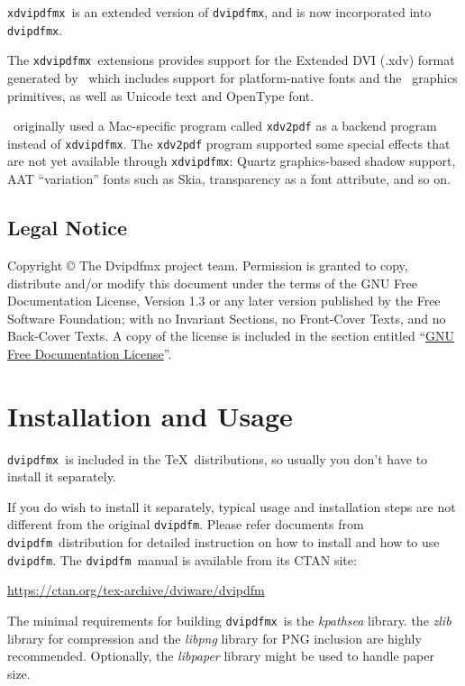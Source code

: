 \documentclass[a4paper,xetex,11pt]{report}
\newcommand{\code}[1]{\mbox{\texttt{#1}}}
\newcommand{\keyword}[1]{\textit{#1}}
\newcommand{\dvipdfm}{\texttt{dvipdfm}}
\newcommand{\dvipdfmx}{\texttt{dvipdfmx}}
\newcommand{\xdvipdfmx}{\texttt{xdvipdfmx}}
\begin{document}
\xdvipdfmx\ is an extended version of \dvipdfmx, and is now incorporated into
\dvipdfmx.

The \xdvipdfmx\ extensions provides support for the Extended DVI (.xdv) format
generated by \XeTeX\ which includes support for platform-native fonts and the
\XeTeX\ graphics primitives, as well as Unicode text and OpenType font.

\XeTeX\ originally used a Mac-specific program called \code{xdv2pdf} as
a backend program instead of \xdvipdfmx. The \code{xdv2pdf} program
supported some special effects that are not yet available through
\xdvipdfmx: Quartz graphics-based shadow support, AAT ``variation''
fonts such as Skia, transparency as a font attribute, and so on.


\subsection{Legal Notice}

Copyright © The Dvipdfmx project team.
Permission is granted to copy, distribute and/or modify this document
under the terms of the GNU Free Documentation License, Version 1.3
or any later version published by the Free Software Foundation;
with no Invariant Sections, no Front-Cover Texts, and no Back-Cover Texts.
A copy of the license is included in the section entitled
``\hyperref[SEC:FDL]{GNU Free Documentation License}''.

\section{Installation and Usage}

\dvipdfmx\ is included in the \TeX\ distributions, so usually you don't
have to install it separately.

If you do wish to install it separately, typical usage and installation
steps are not different from the original \dvipdfm. Please refer
documents from \dvipdfm\ distribution for detailed instruction on how to
install and how to use \dvipdfm. The \dvipdfm\ manual is available from
its CTAN site:\medskip

\url{https://ctan.org/tex-archive/dviware/dvipdfm}
\medskip

The minimal requirements for building \dvipdfmx\ is the \keyword{kpathsea} library.
the \keyword{zlib} library for compression and the \keyword{libpng} library for PNG
inclusion are highly recommended.
Optionally, the \keyword{libpaper} library might be used to handle paper size.
\end{document}
